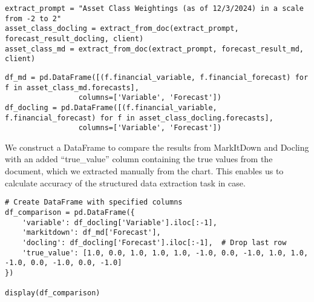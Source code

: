\begin{verbatim}
extract_prompt = "Asset Class Weightings (as of 12/3/2024) in a scale from -2 to 2"
asset_class_docling = extract_from_doc(extract_prompt, forecast_result_docling, client)
asset_class_md = extract_from_doc(extract_prompt, forecast_result_md, client)
\end{verbatim}

\begin{verbatim}
df_md = pd.DataFrame([(f.financial_variable, f.financial_forecast) for f in asset_class_md.forecasts], 
                 columns=['Variable', 'Forecast'])
df_docling = pd.DataFrame([(f.financial_variable, f.financial_forecast) for f in asset_class_docling.forecasts], 
                 columns=['Variable', 'Forecast'])
\end{verbatim}

We construct a DataFrame to compare the results from MarkItDown and Docling with an added ``true\_value'' column containing the true values from the document, which we extracted manually from the chart. This enables us to calculate accuracy of the structured data extraction task in case.

\begin{verbatim}
# Create DataFrame with specified columns
df_comparison = pd.DataFrame({
    'variable': df_docling['Variable'].iloc[:-1],
    'markitdown': df_md['Forecast'],
    'docling': df_docling['Forecast'].iloc[:-1],  # Drop last row
    'true_value': [1.0, 0.0, 1.0, 1.0, 1.0, -1.0, 0.0, -1.0, 1.0, 1.0, -1.0, 0.0, -1.0, 0.0, -1.0]
})

display(df_comparison)
\end{verbatim}

